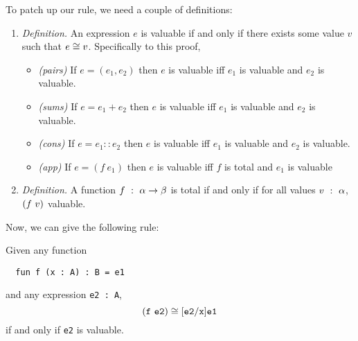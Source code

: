 \documentclass[11pt]{article}
\begin{document}
To patch up our rule, we need a couple of definitions:
\begin{enumerate}
\item \emph{Definition.} An expression $e$ is valuable if and only if there
  exists some value $v$ such that ${e} \cong {v}$. Specifically to this proof,
  \begin{itemize}
  \item \emph{(pairs)} If $e = (e_1,e_2)$ then $e$ is valuable iff $e_1$ is
    valuable and $e_2$ is valuable.

  \item \emph{(sums)} If $e = e_1+e_2$ then $e$ is valuable iff $e_1$ is
    valuable and $e_2$ is valuable.

  \item \emph{(cons)} If $e = e_1::e_2$ then $e$ is valuable iff $e_1$ is
    valuable and $e_2$ is valuable.

  \item \emph{(app)} If $e = (f ~e_1)$ then $e$ is valuable iff $f$ is
    total and $e_1$ is valuable

  \end{itemize}

\item \emph{Definition.} A function ${f}\ :\ {{\alpha} \to {\beta}}$ is
  total if and only if for all values ${v}\ :\ {\alpha}$, $({f}~{v})$
  valuable.
\end{enumerate}
Now, we can give the following rule:

\begin{framed}
  \noindent
  Given any function
\begin{verbatim}
  fun f (x : A) : B = e1
\end{verbatim}
and any expression \texttt{e2 : A}, $${({\mathtt{f}}~{\mathtt{e2}})} \cong {\mathtt{[e2/x]e1}}$$ if and only if \texttt{e2} is valuable.
\end{framed}
\end{document}
